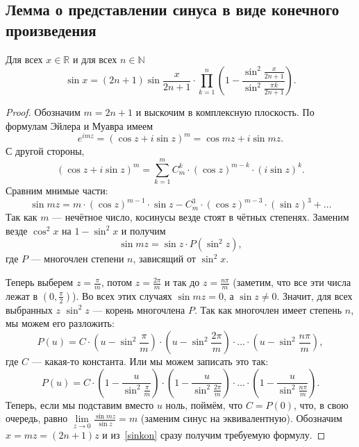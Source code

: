\subsection{Лемма о представлении синуса в виде конечного произведения}

\begin{lemma} \hypertarget{sinlem}{}
	Для всех \(x \in \mathbb{R}\) и для всех \(n \in \mathbb{N}\) \[
		\sin x = (2n + 1) \sin \frac{x}{2n + 1} \cdot \prod_{k=1}^{n} \left(1 - \frac{\sin^2 \frac{x}{2n + 1}}{\sin^2 \frac{\pi k}{2n + 1}} \right).
	\]
\end{lemma}
\begin{proof}
	Обозначим \(m = 2n + 1\) и выскочим в комплексную плоскость. По формулам Эйлера и Муавра имеем \[
		e^{i m z} = (\cos z + i \sin z)^m = \cos mz + i \sin mz.
	\]
	С другой стороны, \[
		(\cos z + i \sin z)^m = \sum_{k=1}^{m} C_m^k \cdot (\cos z)^{m-k} \cdot (i \sin z)^k.
	\]
	Сравним мнимые части: \[
		\sin mz = m \cdot (\cos z)^{m-1} \cdot \sin z - C_m^3 \cdot (\cos z)^{m-3} \cdot (\sin z)^3 + \ldots
	\]
	Так как \(m\) --- нечётное число, косинусы везде стоят в чётных степенях. Заменим везде \(\cos^2 x\) на \(1 - \sin^2 x\) и получим
	\begin{equation} \label{sinkon}
		\sin mz = \sin z \cdot P(\sin^2 z),
	\end{equation}
	где \(P\) --- многочлен степени \(n\), зависящий от \(\sin^2 x\).
	
	Теперь выберем \(z = \frac{\pi}{m}\), потом \(z = \frac{2 \pi}{m}\) и так до \(z = \frac{n \pi}{m}\) \big(заметим, что все эти числа лежат в \(\left(0, \frac{\pi}{2} \right)\)\big). Во всех этих случаях \(\sin mz = 0\), а \(\sin z \neq 0\). Значит, для всех выбранных \(z\) \(\sin^2 z\) --- корень многочлена \(P\). Так как многочлен имеет степень \(n\), мы можем его разложить: \[
		P(u) = C \cdot \left(u - \sin^2 \frac{\pi}{m} \right) \cdot \left(u - \sin^2 \frac{2 \pi}{m} \right) \cdot \ldots \cdot \left(u - \sin^2 \frac{n \pi}{m} \right),
	\]
	где \(C\) --- какая-то константа. Или мы можем записать это так: \[
		P(u) = C \cdot \left(1 - \frac{u}{\sin^2 \frac{\pi}{m}} \right) \cdot \left(1 - \frac{u}{\sin^2 \frac{2 \pi}{m}} \right) \cdot \ldots \cdot \left(1 - \frac{u}{\sin^2 \frac{n \pi}{m}} \right).
	\]
	Теперь, если мы подставим вместо \(u\) ноль, поймём, что \(C = P(0)\), что, в свою очередь, равно \(\lim\limits_{z \to 0} \frac{\sin mz}{\sin z} = m\) (заменим синус на эквивалентную). Обозначим \(x = mz = (2n + 1) z\) и из~\eqref{sinkon} сразу получим требуемую формулу.
\end{proof}

